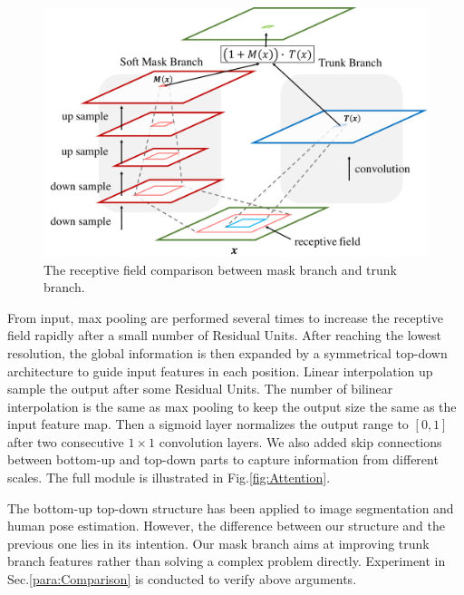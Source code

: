 \documentclass[10pt,twocolumn,letterpaper]{article}
\begin{document}
\begin{figure}[t]
\setlength{\belowcaptionskip}{-10pt}
\setlength{\abovecaptionskip}{0pt}
\begin{center}
   \includegraphics[width=1\linewidth]{attention.pdf}
\end{center}
   \caption{The receptive field comparison between mask branch and trunk branch.}
\label{fig:attentionunit}
\end{figure}

From input, max pooling are performed several times to increase the receptive field rapidly after a small number of Residual Units. After reaching the lowest resolution, the global information is then expanded by a symmetrical top-down architecture to guide input features in each position. Linear interpolation up sample the output after some Residual Units. The number of bilinear interpolation is the same as max pooling to keep the output size the same as the input feature map. Then a sigmoid layer normalizes the output range to $[0,1]$ after two consecutive $1\times 1$ convolution layers. We also added skip connections between bottom-up and top-down parts to capture information from different scales. The full module is illustrated in Fig.\ref{fig:Attention}.

The bottom-up top-down structure has been applied to image segmentation and human pose estimation. However, the difference between our structure and the previous one lies in its intention. Our mask branch aims at improving trunk branch features rather than solving a complex problem directly. Experiment in Sec.\ref{para:Comparison} is conducted to verify above arguments.
\end{document}

